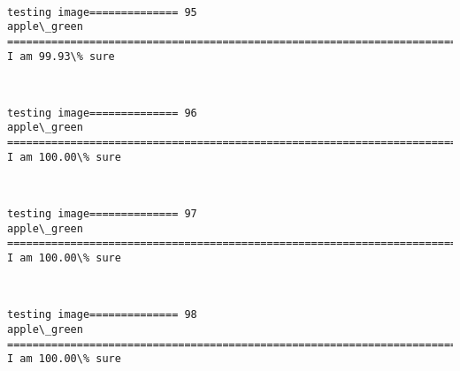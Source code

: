 \documentclass[11pt]{article}
\begin{document}
    \begin{center}
    \end{center}
    { \hspace*{\fill} \\}
    
    \begin{Verbatim}[commandchars=\\\{\}]
testing image============== 95
apple\_green
============================================================================
I am 99.93\% sure

    \end{Verbatim}

    \begin{center}
    \end{center}
    { \hspace*{\fill} \\}
    
    \begin{Verbatim}[commandchars=\\\{\}]
testing image============== 96
apple\_green
============================================================================
I am 100.00\% sure

    \end{Verbatim}

    \begin{center}
    \end{center}
    { \hspace*{\fill} \\}
    
    \begin{Verbatim}[commandchars=\\\{\}]
testing image============== 97
apple\_green
============================================================================
I am 100.00\% sure

    \end{Verbatim}

    \begin{center}
    \end{center}
    { \hspace*{\fill} \\}
    
    \begin{Verbatim}[commandchars=\\\{\}]
testing image============== 98
apple\_green
============================================================================
I am 100.00\% sure

    \end{Verbatim}
\end{document}
